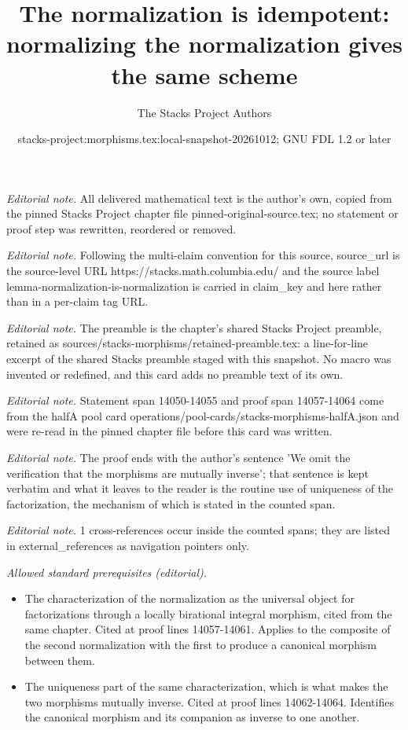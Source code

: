\documentclass[10pt,a4paper]{amsart}
\title{The normalization is idempotent: normalizing the normalization gives the same scheme}
\author{The Stacks Project Authors}
\date{stacks-project:morphisms.tex:local-snapshot-20261012; GNU FDL 1.2 or later}
\theoremstyle{plain}
\theoremstyle{definition}
\theoremstyle{remark}
\numberwithin{equation}{subsection}
\begin{document}
\maketitle
\noindent\textit{Editorial note.} All delivered mathematical text is the author's own, copied from the pinned Stacks Project chapter file pinned-original-source.tex; no statement or proof step was rewritten, reordered or removed.\par\medskip
\noindent\textit{Editorial note.} Following the multi-claim convention for this source, source\_url is the source-level URL https://stacks.math.columbia.edu/ and the source label lemma-normalization-is-normalization is carried in claim\_key and here rather than in a per-claim tag URL.\par\medskip
\noindent\textit{Editorial note.} The preamble is the chapter's shared Stacks Project preamble, retained as sources/stacks-morphisms/retained-preamble.tex: a line-for-line excerpt of the shared Stacks preamble staged with this snapshot. No macro was invented or redefined, and this card adds no preamble text of its own.\par\medskip
\noindent\textit{Editorial note.} Statement span 14050-14055 and proof span 14057-14064 come from the halfA pool card operations/pool-cards/stacks-morphisms-halfA.json and were re-read in the pinned chapter file before this card was written.\par\medskip
\noindent\textit{Editorial note.} The proof ends with the author's sentence 'We omit the verification that the morphisms are mutually inverse'; that sentence is kept verbatim and what it leaves to the reader is the routine use of uniqueness of the factorization, the mechanism of which is stated in the counted span.\par\medskip
\noindent\textit{Editorial note.} 1 cross-references occur inside the counted spans; they are listed in external\_references as navigation pointers only.\par\medskip
\noindent\textit{Allowed standard prerequisites (editorial).}\begin{itemize}
\item The characterization of the normalization as the universal object for factorizations through a locally birational integral morphism, cited from the same chapter. Cited at proof lines 14057-14061. Applies to the composite of the second normalization with the first to produce a canonical morphism between them.
\item The uniqueness part of the same characterization, which is what makes the two morphisms mutually inverse. Cited at proof lines 14062-14064. Identifies the canonical morphism and its companion as inverse to one another.
\end{itemize}\medskip
\end{document}
